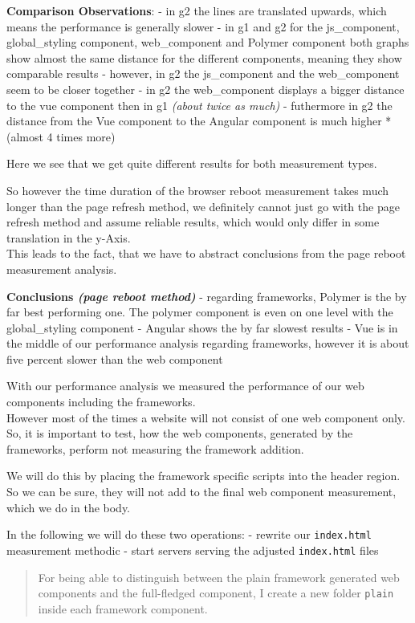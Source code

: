 \documentclass[11pt]{article}
\begin{document}
    \textbf{Comparison Observations}: - in g2 the lines are translated
upwards, which means the performance is generally slower - in g1 and g2
for the js\_component, global\_styling component, web\_component and
Polymer component both graphs show almost the same distance for the
different components, meaning they show comparable results - however, in
g2 the js\_component and the web\_component seem to be closer together -
in g2 the web\_component displays a bigger distance to the vue component
then in g1 \emph{(about twice as much)} - futhermore in g2 the distance
from the Vue component to the Angular component is much higher *(almost
4 times more)

Here we see that we get quite different results for both measurement
types.

So however the time duration of the browser reboot measurement takes
much longer than the page refresh method, we definitely cannot just go
with the page refresh method and assume reliable results, which would
only differ in some translation in the y-Axis.\\
This leads to the fact, that we have to abstract conclusions from the
page reboot measurement analysis.

\textbf{Conclusions \emph{(page reboot method)}} - regarding frameworks,
Polymer is the by far best performing one. The polymer component is even
on one level with the global\_styling component - Angular shows the by
far slowest results - Vue is in the middle of our performance analysis
regarding frameworks, however it is about five percent slower than the
web component

    With our performance analysis we measured the performance of our web
components including the frameworks.\\
However most of the times a website will not consist of one web
component only. So, it is important to test, how the web components,
generated by the frameworks, perform not measuring the framework
addition.

We will do this by placing the framework specific scripts into the
header region.\\
So we can be sure, they will not add to the final web component
measurement, which we do in the body.

In the following we will do these two operations: - rewrite our
\texttt{index.html} measurement methodic - start servers serving the
adjusted \texttt{index.html} files

    \begin{quote}
For being able to distinguish between the plain framework generated web
components and the full-fledged component, I create a new folder
\texttt{plain} inside each framework component.
\end{quote}
\end{document}
